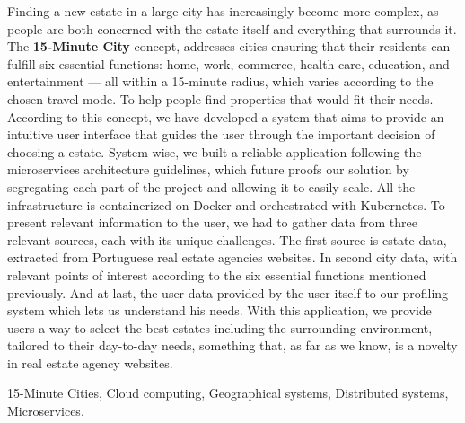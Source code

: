 \abstractEN %

Finding a new estate in a large city has increasingly become more complex, as people are both concerned with the estate itself and everything that surrounds it. The \textbf{15-Minute City} concept, addresses cities ensuring that their residents can fulfill six essential functions: home, work, commerce, health care, education, and entertainment --- all within a 15-minute radius, which varies according to the chosen travel mode.
To help people find properties that would fit their needs. According to this concept, we have developed a system that aims to provide an intuitive user interface that guides the user through the important decision of choosing a estate. System-wise, we built a reliable application following the microservices architecture guidelines, which future proofs our solution by segregating each part of the project and allowing it to easily scale. All the infrastructure is containerized on Docker and orchestrated with Kubernetes.
To present relevant information to the user, we had to gather data from three relevant sources, each with its unique challenges. The first source is estate data, extracted from Portuguese real estate agencies websites. In second city data, with relevant points of interest according to the six essential functions mentioned previously. And at last, the user data provided by the user itself to our profiling system which lets us understand his needs. 
With this application, we provide users a way to select the best estates including the surrounding environment, tailored to their day-to-day needs, something that, as far as we know, is a novelty in real estate agency websites. 

\begin{keywords}
15-Minute Cities, Cloud computing, Geographical systems, Distributed systems, Microservices.
\end{keywords} 
